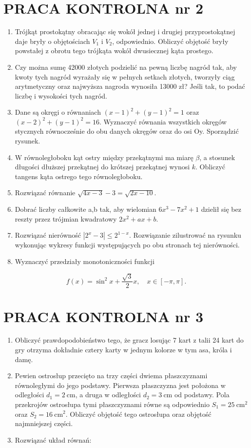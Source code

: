 \documentclass[10pt]{article}
\begin{document}
\section*{PRACA KONTROLNA nr 2}
\begin{enumerate}
  \item Trójkąt prostokątny obracając się wokół jednej i drugiej przyprostokątnej daje bryły o objętościach $V_{1}$ i $V_{2}$, odpowiednio. Obliczyć objętość bryły powstałej z obrotu tego trójkąta wokół dwusiecznej kąta prostego.
  \item Czy można sumę 42000 złotych podzielić na pewną liczbę nagród tak, aby kwoty tych nagród wyrażały się w pełnych setkach złotych, tworzyły ciąg arytmetyczny oraz najwyższa nagroda wynosiła 13000 zł? Jeśli tak, to podać liczbę i wysokości tych nagród.
  \item Dane są okręgi o równaniach $(x-1)^{2}+(y-1)^{2}=1$ oraz $(x-2)^{2}+(y-1)^{2}=16$. Wyznaczyć równania wszystkich okręgów stycznych równocześnie do obu danych okręgów oraz do osi Oy. Sporządzić rysunek.
  \item W równoległoboku kąt ostry między przekątnymi ma miarę $\beta$, a stosunek długości dłuższej przekątnej do krótszej przekątnej wynosi $k$. Obliczyć tangens kąta ostrego tego równoległoboku.
  \item Rozwiązać równanie $\sqrt{4 x-3}-3=\sqrt{2 x-10}$.
  \item Dobrać liczby całkowite a,b tak, aby wielomian $6 x^{3}-7 x^{2}+1$ dzielił się bez reszty przez trójmian kwadratowy $2 x^{2}+a x+b$.
  \item Rozwiązać nierówność $\left|2^{x}-3\right| \leqslant 2^{1-x}$. Rozwiązanie zilustrować na rysunku wykonując wykresy funkcji występujących po obu stronach tej nierówności.
  \item Wyznaczyć przedziały monotoniczności funkcji
\end{enumerate}

$$
f(x)=\sin ^{2} x+\frac{\sqrt{3}}{2} x, \quad x \in[-\pi, \pi] .
$$

\section*{PRACA KONTROLNA nr 3}
\begin{enumerate}
  \item Obliczyć prawdopodobieństwo tego, że gracz losując 7 kart z talii 24 kart do gry otrzyma dokładnie cztery karty w jednym kolorze w tym asa, króla i damę.
  \item Pewien ostrosłup przecięto na trzy części dwiema płaszczyznami równoległymi do jego podstawy. Pierwsza płaszczyzna jest położona w odległości $d_{1}=2 \mathrm{~cm}$, a druga w odległości $d_{2}=3 \mathrm{~cm}$ od podstawy. Pola przekrojów ostrosłupa tymi płaszczyznami równe są odpowiednio $S_{1}=25 \mathrm{~cm}^{2}$ oraz $S_{2}=16 \mathrm{~cm}^{2}$. Obliczyć objętość tego ostrosłupa oraz objętość najmniejszej części.
  \item Rozwiązać układ równań:
\end{enumerate}
\end{document}
